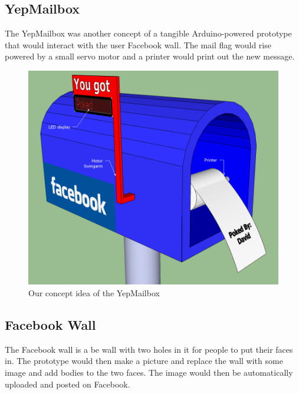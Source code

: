 \newpage

\subsection{YepMailbox}
The YepMailbox was another concept of a tangible Arduino-powered prototype that would interact with the user Facebook wall.
The mail flag would rise powered by a small servo motor and a printer would print out the new message.

\begin{figure}[h!]
\centering \includegraphics[scale=0.4]{img/prestudies-YepMailbox} \caption{Our concept idea of the YepMailbox}

\label{fig:prestudies-YepMailbox}
\end{figure}

\newpage

\subsection{Facebook Wall}
The Facebook wall is a be wall with two holes in it for people to put their faces in. The prototype would then make a
picture and replace the wall with some image and add bodies to the two faces. The image would then be automatically
uploaded and posted on Facebook.

